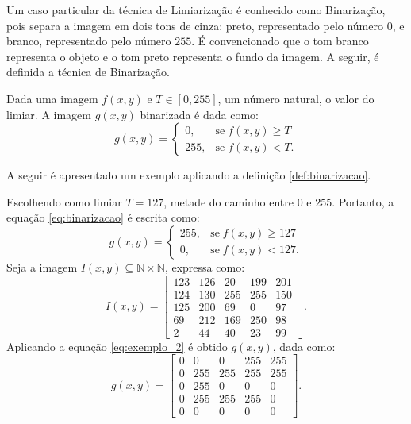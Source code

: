 Um caso particular da técnica de Limiarização é conhecido como Binarização, pois separa a imagem em dois tons de cinza: preto, representado pelo número $0$, e branco, representado pelo número $255$. É convencionado que o tom branco representa o objeto e o tom preto representa o fundo da imagem. A seguir, é definida a técnica de Binarização.

\begin{define}
	Dada uma imagem $f(x,y)$ e $T \in [0,255]$, um número natural, o valor do limiar. A imagem $g(x,y)$ binarizada é dada como:
	\begin{equation}
		g(x,y) =
		\begin{cases}
			0, & \text{se} \; f(x,y) \geq T \\
			255, & \text{se} \; f(x,y)   <  T.
		\end{cases}
		\label{eq:binarizacao}
	\end{equation}
	\label{def:binarizacao}
\end{define}

A seguir é apresentado um exemplo aplicando a definição \ref{def:binarizacao}.

\begin{exemplo}
	Escolhendo como limiar $T = 127$, metade do caminho entre $0$ e $255$. Portanto, a equação \ref{eq:binarizacao} é escrita como: 
	\begin{equation}
		g(x,y) =
		\begin{cases}
			255, & \text{se} \; f(x,y) \geq 127 \\
			0, & \text{se} \; f(x,y)   <  127.
		\end{cases}
		\label{eq:exemplo_2}
	\end{equation}
	Seja a imagem $I(x,y) \subseteq \mathbb{N} \times \mathbb{N}$, expressa como:
	\begin{equation}
		I(x,y) = \begin{bmatrix}
			123 & 126 & 20 & 199 & 201 \\
			124 & 130 & 255 & 255 & 150 \\
			125 & 200 & 69 & 0 & 97 \\
			69 & 212 & 169 & 250 & 98 \\
			2 & 44 & 40 & 23 & 99
		\end{bmatrix}.
	\end{equation}
	Aplicando a equação \ref{eq:exemplo_2} é obtido $g(x,y)$, dada como: 
	\begin{equation}
		g(x,y) = \begin{bmatrix}
			0 &   0 &   0 & 255 & 255 \\
			0 & 255 & 255 & 255 & 255 \\
			0 & 255 &   0 &   0 &   0 \\
			0 & 255 & 255 & 255 &   0 \\
			0 &   0 &   0 &   0 &   0
		\end{bmatrix}.
	\end{equation}
\end{exemplo}

